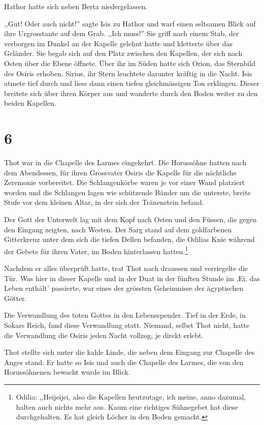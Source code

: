 Hathor hatte sich neben Berta niedergelassen.

,,Gut! Oder auch nicht!'' sagte Isis zu Hathor und warf einen seltsamen Blick auf ihre Urgrosstante auf dem Grab. ,,Ich muss!'' Sie griff nach einem Stab, der verborgen im Dunkel an der Kapelle gelehnt hatte und kletterte über das Geländer. Sie begab sich auf den Platz zwischen den Kapellen, der sich nach Osten über die Ebene öffnete. Über ihr im Süden hatte sich Orion, das Sternbild des Osiris erhoben. Sirius, ihr Stern leuchtete darunter kräftig in die Nacht. Isis atmete tief durch und liess dann einen tiefen gleichmässigen Ton erklingen. Dieser breitete sich über ihren Körper aus und wanderte durch den Boden weiter zu den beiden Kapellen.

\section*{6}

Thot war in die Chapelle des Larmes eingekehrt. Die Horussöhne hatten nach dem Abendessen, für ihren Grossvater Osiris die Kapelle für die nächtliche Zeremonie vorbereitet. Die Schlangenkörbe waren je vor einer Wand platziert worden und die Schlangen lagen wie schützende Bänder um die unterste, breite Stufe vor dem kleinen Altar, in der sich der Tränenstein befand. 

Der Gott der Unterwelt lag mit dem Kopf nach Osten und den Füssen, die gegen den Eingang zeigten, nach Westen. Der Sarg stand auf dem goldfarbenen Gitterkreuz unter dem sich die tiefen Dellen befanden, die Odilias Knie während der Gebete für ihren Vater, im Boden hinterlassen hatten.\footnote{Odilia: ,,Heijeijei, also die Kapellen  heutzutage, ich meine, anno dazumal, halten auch nichts mehr aus. Kaum eine richtiges Sühnegebet hat diese durchgehalten. Es hat gleich Löcher in den Boden gemacht.}

Nachdem er alles überprüft hatte, trat Thot nach draussen und verriegelte die Tür. Was hier in dieser Kapelle und in der Duat in der fünften Stunde im ,Ei, das Leben enthält' passierte, war eines der grössten Geheimnisse der ägyptischen Götter.

Die Verwandlung des toten Gottes in den Lebensspender. Tief in der Erde, in Sokars Reich, fand diese Verwandlung statt. Niemand, selbst Thot nicht, hatte die Verwandlung die Osiris jeden Nacht vollzog, je direkt erlebt. 

Thot stellte sich unter die kahle Linde, die neben dem Eingang zur Chapelle des Anges stand. Er hatte so Isis und auch die Chapelle des Larmes, die von den Horussöhnenen bewacht wurde im Blick.

